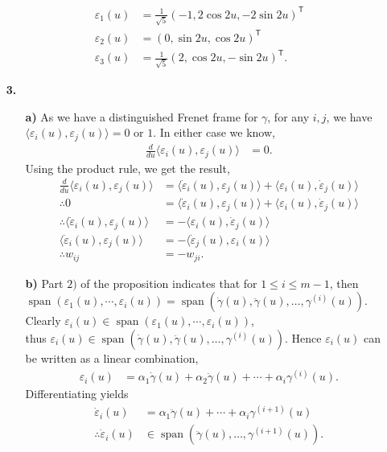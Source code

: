 \documentclass[a4paper]{article}
\newcommand{\ip}[2]{\langle #1, #2 \rangle}
\newcommand{\e}[1]{\varepsilon_{#1}(u)}
\newcommand{\dote}[1]{\dot{\varepsilon}_{#1}(u)}
\newcommand{\ds}{\displaystyle}
\DeclareMathOperator{\spn}{span}
\begin{document}
\begin{enumerate}[leftmargin=*]
	\begin{align*}
		\varepsilon_1(u) & = \frac{1}{\sqrt{5}}(-1, 2\cos{2u}, -2\sin{2u})^\mathsf{T} \\
		\varepsilon_2(u) & = (0, \sin{2u}, \cos{2u})^{\mathsf{T}} \\
		\varepsilon_3(u) &  = \frac{1}{\sqrt{5}}(2, \cos{2u}, -\sin{2u})^\mathsf{T}.
	\end{align*}

\item[\textbf{3.}]
\begin{enumerate}[leftmargin=*]
\item[\textbf{a)}]
	As we have a distinguished Frenet frame for $\ds{\gamma}$, for any $\ds{i, j}$, we have $\ds{\ip{\varepsilon_i(u)}{\varepsilon_j(u)} = 0}$ or $\ds{1}$. In either case we know,
	\begin{align*}
		\frac{d}{du}\ip{\varepsilon_i(u)}{\varepsilon_j(u)} & = 0.
	\end{align*}
	Using the product rule, we get the result,
	\begin{align*}
		\frac{d}{du}\ip{\varepsilon_i(u)}{\varepsilon_j(u)} & = \ip{\dote{i}}{\e{j}} + \ip{\e{i}}{\dote{j}} \\
		\therefore 0 & = \ip{\dote{i}}{\e{j}} + \ip{\e{i}}{\dote{j}} \\
		\therefore \ip{\dote{i}}{\e{j}} & = - \ip{\e{i}}{\dote{j}} \\
		\ip{\dote{i}}{\e{j}} & = - \ip{\dote{j}}{\e{i}} \\
		\therefore w_{ij} & = - w_{ji}.
	\end{align*}
\item[\textbf{b)}]
	Part $\ds{2)}$ of the proposition indicates that for $\ds{1 \leq i \leq m - 1}$, then\\ $\ds{\spn(\e{1}, \cdots , \e{i}) = \spn(\dot{\gamma}(u), \ddot{\gamma}(u), \dots , \gamma^{(i)}(u))}$. Clearly $\ds{\e{i} \in \spn(\e{1}, \cdots , \e{i})}$, \\thus $\ds{\e{i} \in \spn(\dot{\gamma}(u), \ddot{\gamma}(u), \dots , \gamma^{(i)}(u))}$. Hence $\ds{\e{i}}$ can be written as a linear combination,
	\begin{align*}
		\e{i} & = \alpha_1 \dot{\gamma}(u) + \alpha_2 \ddot{\gamma}(u) + \cdots + \alpha_i \gamma^{(i)}(u).
	\end{align*}
	Differentiating yields
	\begin{align*}
		\dote{i} & = \alpha_1 \ddot{\gamma}(u) + \cdots + \alpha_i \gamma^{(i + 1)}(u) \\
		\therefore \dote{i} & \in \spn(\ddot{\gamma}(u), \dots ,\gamma^{(i + 1)}(u)).

\end{align*}
\end{enumerate}
\end{enumerate}
\end{document}
